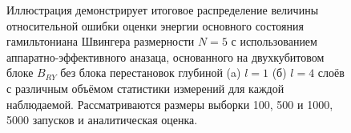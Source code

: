 \documentclass[14pt]{extarticle}
\begin{document}
\begin{figure}[H]
\begin{minipage}[H]{0.49\linewidth}
\end{minipage}
\hfill
\begin{minipage}[H]{0.49\linewidth}
\end{minipage}
\caption{Иллюстрация демонстрирует итоговое распределение величины относительной ошибки оценки энергии основного состояния гамильтониана Швингера размерности $N = 5$ с использованием аппаратно-эффективного аназаца, основанного на двухкубитовом блоке $B_{RY}$ без блока перестановок глубиной (a) $l = 1$ (б) $l = 4$ слоёв с различным объёмом статистики измерений для каждой наблюдаемой. Рассматриваются размеры выборки 100, 500 и 1000, 5000 запусков и аналитическая оценка.}\label{fig:shots_comp_res}
\end{figure}
\end{document}
